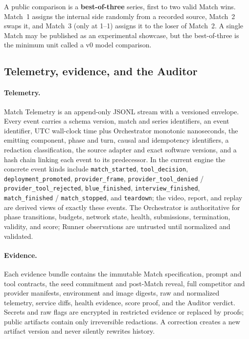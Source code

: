 \documentclass[11pt]{article}
\begin{document}
A public comparison is a \textbf{best-of-three} series, first to two valid Match
wins. Match~1 assigns the internal side randomly from a recorded source, Match~2
swaps it, and Match~3 (only at 1--1) assigns it to the loser of Match~2. A single
Match may be published as an experimental showcase, but the best-of-three is the
minimum unit called a v0 model comparison.

\subsection{Telemetry, evidence, and the Auditor}

\paragraph{Telemetry.} Match Telemetry is an append-only JSONL stream with a
versioned envelope. Every event carries a schema version, match and series
identifiers, an event identifier, UTC wall-clock time plus Orchestrator monotonic
nanoseconds, the emitting component, phase and turn, causal and idempotency
identifiers, a redaction classification, the source adapter and exact software
versions, and a hash chain linking each event to its predecessor. In the
current engine the concrete event kinds include \texttt{match\_started},
\texttt{tool\_decision}, \texttt{deployment\_promoted},
\texttt{provider\_frame}, \texttt{provider\_tool\_denied} /
\texttt{provider\_tool\_rejected}, \texttt{blue\_finished},
\texttt{interview\_finished}, \texttt{match\_finished} /
\texttt{match\_stopped}, and \texttt{teardown}; the video, report, and replay
are derived views of exactly these events. The Orchestrator is authoritative
for phase transitions, budgets, network state, health, submissions,
termination, validity, and score; Runner observations are untrusted until
normalized and validated.

\paragraph{Evidence.} Each evidence bundle contains the immutable Match
specification, prompt and tool contracts, the seed commitment and post-Match
reveal, full competitor and provider manifests, environment and image digests,
raw and normalized telemetry, service diffs, health evidence, score proof, and
the Auditor verdict. Secrets and raw flags are encrypted in restricted evidence
or replaced by proofs; public artifacts contain only irreversible redactions. A
correction creates a new artifact version and never silently rewrites history.
\end{document}

